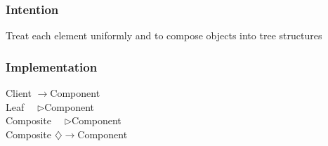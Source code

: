 \documentclass[a4paper]{scrartcl}
\newcommand{\aggregates}{$\diamondsuit\rightarrow $}
\newcommand{\implements}{\textendash ~\textendash ~\textendash$\triangleright$}
\newcommand{\uses}{$\longrightarrow$}
\begin{document}
      \subsubsection {Intention }
        Treat each element uniformly and to compose objects into tree structures
      \subsubsection{Implementation}
        Client \uses Component\\
        Leaf \implements Component \\
        Composite \implements Component \\
        Composite \aggregates Component \\
        
        
\end{document}
